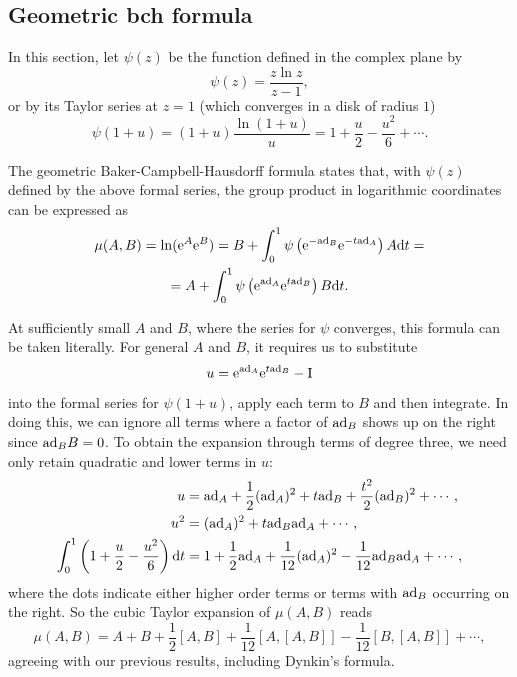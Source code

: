 \subsection{Geometric \texorpdfstring{\gls{bch}}{BCH} formula}

In this section, let $\psi(z)$ be the function defined in the complex plane by
\[\psi(z)=\frac{z\ln z}{z-1},\]
or by its Taylor series at $z=1$ (which converges in a disk of radius $1$)
\[\psi(1+u)=(1+u)\frac{\ln (1+u)}{u}=1+\frac{u}{2}-\frac{u^2}{6}+\cdots .\]

\begin{thm}
The geometric Baker-Campbell-Hausdorff formula states that, with $\psi(z)$ defined by the above formal series, the group product in logarithmic coordinates can be expressed as
\begin{multline}
    \mu(A,B) =\ln(\mathrm{e}^A\mathrm{e}^B)=
    B+\int_0^1\psi\left(\mathrm{e}^{-\mathrm{ad}_B}\mathrm{e}^{-t\mathrm{ad}_A}\right)A{\mathrm{d}} t=\\
    =A+\int_0^1\psi\left(\mathrm{e}^{\mathrm{ad}_A}\mathrm{e}^{t\mathrm{ad}_B}\right)B{\mathrm{d}} t.\label{eq geom BCH}
\end{multline}
\end{thm}
At sufficiently small $A$ and $B$, where the series for $\psi$ converges, this formula can be taken literally. For general $A$ and $B$, it requires us to substitute 
\[u=\mathrm{e}^{\mathrm{ad}_A}\mathrm{e}^{t\mathrm{ad}_B}-\mathrm{I}\]
into the formal series for $\psi(1+u)$, apply each term to $B$ and then integrate. In doing this, we can ignore all terms where a factor of $\mathrm{ad}_B$ shows up on the right since $\mathrm{ad}_B B=0$. To obtain the expansion through terms of degree three, we need only retain quadratic and lower terms in $u$:
\begin{align}
    u  &=\mathrm{ad}_A+\frac12(\mathrm{ad}_A)^2+t\mathrm{ad}_B+\frac{t^2}{2}(\mathrm{ad}_B)^2+\cdots,\\
    u^2&=(\mathrm{ad}_A)^2+t\mathrm{ad}_B\mathrm{ad}_A+\cdots,\\
    \int_0^1\left(1+\frac u2-\frac{u^2}{6}\right){\mathrm{d}} t&= 1+\frac 12\mathrm{ad}_A+\frac{1}{12}(\mathrm{ad}_A)^2-\frac{1}{12}\mathrm{ad}_B \mathrm{ad}_A+\cdots,
\end{align}
where the dots indicate either higher order terms or terms with $\mathrm{ad}_B$ occurring on the right. So the cubic Taylor expansion of $\mu(A,B)$ reads
\[\mu(A,B)=A+B+\frac12[A,B]+\frac{1}{12}[A,[A,B]]-\frac{1}{12}[B,[A,B]]+\cdots,\]
agreeing with our previous results, including Dynkin's formula.

